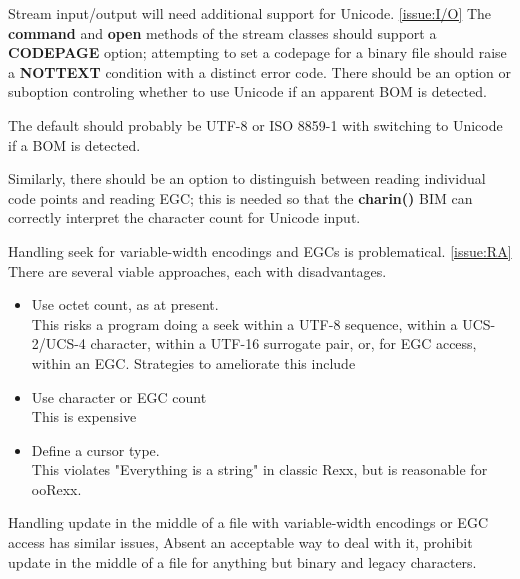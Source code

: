 \documentclass[b4paper]{article}
\begin{document}
Stream input/output will need additional support for Unicode.
\cref{issue:I/O}
The \textbf{command}  and \textbf{open} methods of the stream classes
should support a \textbf{CODEPAGE} option; attempting to set a
codepage for a binary file should raise a \textbf{NOTTEXT} condition
with a distinct error code.  There should be an option or suboption
controling whether to use Unicode if an apparent BOM is detected.

The default should probably be UTF-8 or ISO 8859-1 with switching to
Unicode if a BOM is detected.

Similarly, there should be an option to distinguish between reading
individual code points and reading EGC; this is needed so that the
\textbf{charin()} BIM can correctly interpret the character count for Unicode input.

Handling seek for variable-width encodings and EGCs is problematical.
\cref{issue:RA}
There are several viable approaches, each with disadvantages.

\begin{itemize}
\item Use octet count, as at present. \\
This risks a program doing a seek within a UTF-8 sequence,
within a UCS-2/UCS-4 character,
within a UTF-16 surrogate pair,
or, for EGC access, within an EGC.
Strategies to ameliorate this include
\item Use character or EGC count \\
This is expensive
\item Define a cursor type. \\
This violates "Everything is a string" in classic Rexx, but is reasonable for ooRexx.
\end{itemize}

Handling update in the middle of a file with variable-width encodings
or EGC access has similar issues, Absent an acceptable way to deal
with it, prohibit update in the middle of a file for anything but
binary and legacy characters.
\end{document}
